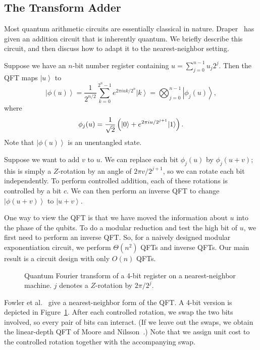 \documentclass{article} %
\newcommand{\caps}[1]{{\sc #1}}
\newcommand{\qu}[1]{{\left| {#1} \right\rangle}}
\newcommand{\QFT}{\caps{QFT}\xspace}
\begin{document}
\subsection{The Transform Adder}
\label{prelim-transform-adder-sec}

Most quantum arithmetic circuits are essentially classical in nature.
Draper~\cite{Drap} has given an addition circuit that is inherently
quantum.  We briefly describe this circuit, and then discuss how to
adapt it to the nearest-neighbor setting.

Suppose we have an $n$-bit number register containing
$u = \sum_{j=0}^{n-1} u_j 2^j$.  Then the {\QFT} maps $\qu{u}$ to
$$
\qu{\phi(u)} =
\frac{1}{2^{n/2}}\sum_{k=0}^{2^n - 1} e^{2 \pi i u k / 2^n} \qu{k}
= \bigotimes_{j=0}^{n-1} \qu{\phi_j(u)},
$$
where
$$
\phi_j(u) = {1 \over \sqrt{2}} \left(\qu{0} + e^{2 \pi i u / 2^{j+1}}\qu{1}
\right).
$$
Note that $\qu{\phi(u)}$ is an unentangled state.

Suppose we want to add $v$ to $u$.  We can 
replace each bit $\phi_j(u)$ by $\phi_j(u + v)$; this is simply a
$Z$-rotation by an angle of $2 \pi v / 2^{j+1}$, so we can rotate each
bit independently.  To perform controlled addition, each of these
rotations is controlled by a bit $c$.  We can then perform an inverse
{\QFT} to change $\qu{\phi(u+v)}$ to $\qu{u+v}$.

One way to view the {\QFT} is that we have moved the information about
$u$ into the phase of the qubits.  To do a modular reduction and test
the high bit of $u$, we first need to perform an inverse {\QFT}.
So, for a naively designed modular exponentiation circuit, we perform
$\Theta(n^2)$ {\QFT}s and inverse {\QFT}s.
Our main result is
a circuit design with only $O(n)$ {\QFT}s.

\begin{figure}[h]
\begin{center}

\end{center}
\caption{Quantum Fourier transform of a 4-bit register on a
nearest-neighbor machine. \textcircled{\scriptsize$j$}
denotes a $Z$-rotation by
$2 \pi / 2^j$.}
\label{qft-fig}
\end{figure}

Fowler et al.~\cite{FDH} give a nearest-neighbor
form of the {\QFT}.  A 4-bit version is depicted
in Figure~\ref{qft-fig}.  After each controlled rotation, we swap the
two bits involved, so every pair of bits can interact.  (If we leave out
the swaps, we obtain the linear-depth {\QFT} of Moore and Nilsson~\cite{MN}.)
Note that we
assign unit cost to the controlled rotation together with the
accompanying swap.
\end{document}
